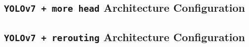 \chapter{}
\section{\texttt{YOLOv7 + more head} Architecture Configuration}

\section{\texttt{YOLOv7 + rerouting} Architecture Configuration}
